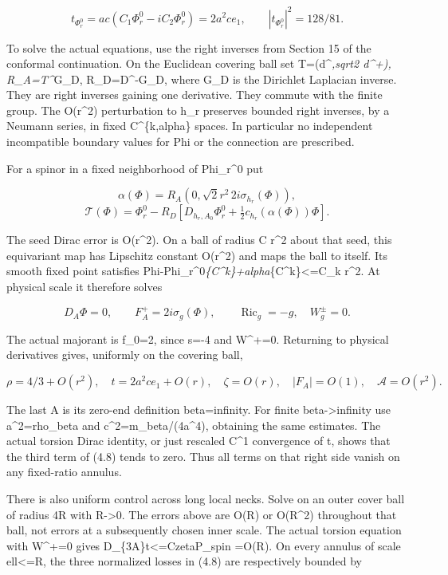 \documentclass[
  10pt,
]{article}
\begin{document}
\[
 t_{\Phi_r^0}=ac(C_1\Phi_r^0-iC_2\Phi_r^0)
                         =2a^2c e_1,
 \qquad |t_{\Phi_r^0}|^2=128/81.                    \tag{4.16}
\]

To solve the actual equations, use the right inverses from Section 15 of
the conformal continuation. On the Euclidean covering ball set
T=(d\^{}\emph{,sqrt2 d\^{}+), R\_A=T\^{}}G\_D, R\_D=D\^{}-G\_D, where
G\_D is the Dirichlet Laplacian inverse. They are right inverses gaining
one derivative. They commute with the finite group. The O(r\^{}2)
perturbation to h\_r preserves bounded right inverses, by a Neumann
series, in fixed C\^{}\{k,alpha\} spaces. In particular no independent
incompatible boundary values for Phi or the connection are prescribed.

For a spinor in a fixed neighborhood of Phi\_r\^{}0 put

\[
 \alpha(\Phi)=R_A(0,\sqrt2 r^2\,2i\sigma_{h_r}(\Phi)),
\] \[
 \mathcal T(\Phi)=\Phi_r^0-R_D\left[
 D_{h_r,A_0}\Phi_r^0+\tfrac12c_{h_r}(\alpha(\Phi))\Phi\right].
\]

The seed Dirac error is O(r\^{}2). On a ball of radius C r\^{}2 about
that seed, this equivariant map has Lipschitz constant O(r\^{}2) and
maps the ball to itself. Its smooth fixed point satisfies
\textbar\textbar Phi-Phi\_r\^{}0\textbar\textbar{}\emph{\{C\^{}k\}+\textbar\textbar alpha\textbar\textbar{}}\{C\^{}k\}\textless=C\_k
r\^{}2. At physical scale it therefore solves

\[
 D_A\Phi=0,\qquad F_A^+=2i\sigma_g(\Phi),\qquad
 \operatorname{Ric}_g=-g,\quad W_g^\pm=0.            \tag{4.17}
\]

The actual majorant is f\_0=2, since s=-4 and W\^{}+=0. Returning to
physical derivatives gives, uniformly on the covering ball,

\[
 \rho=4/3+O(r^2),\quad t=2a^2c e_1+O(r),\quad
 \zeta=O(r),\quad |F_A|=O(1),\quad\mathcal A=O(r^2).
\]

The last A is its zero-end definition beta=infinity. For finite
beta-\textgreater infinity use a\^{}2=rho\_beta and
c\^{}2=m\_beta/(4a\^{}4), obtaining the same estimates. The actual
torsion Dirac identity, or just rescaled C\^{}1 convergence of t, shows
that the third term of (4.8) tends to zero. Thus all terms on that right
side vanish on any fixed-ratio annulus.

There is also uniform control across long local necks. Solve on an outer
cover ball of radius 4R with R-\textgreater0. The errors above are O(R)
or O(R\^{}2) throughout that ball, not errors at a subsequently chosen
inner scale. The actual torsion equation with W\^{}+=0 gives
\textbar D\_\{3A\}t\textbar\textless=C\textbar zeta\textbar\textbar P\_spin\textbar{}
=O(R). On every annulus of scale ell\textless=R, the three normalized
losses in (4.8) are respectively bounded by
\end{document}
